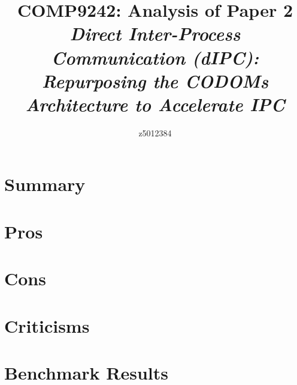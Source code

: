 \documentclass{article}
\begin{document}
\title{COMP9242: Analysis of Paper 2 \\ \vspace{0.75cm} \large \textit{Direct Inter-Process Communication (dIPC): Repurposing the CODOMs Architecture to Accelerate IPC}}

\author{z5012384}

\maketitle

\section*{Summary}


\section*{Pros}


\section*{Cons}


\section*{Criticisms}


\section*{Benchmark Results}

\nocite{*}


\end{document}
